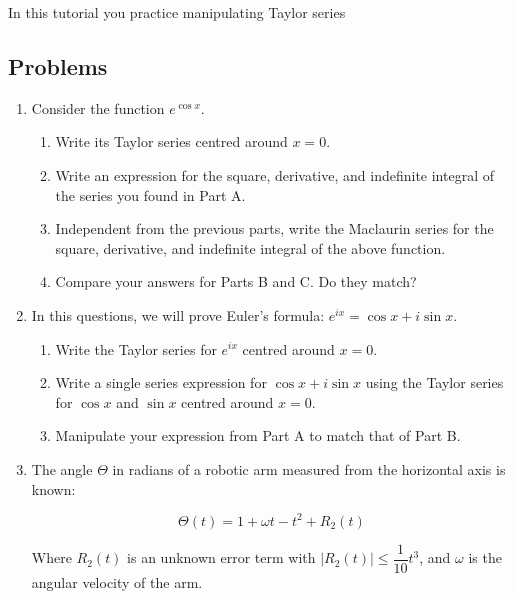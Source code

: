 		\begin{objectives}
			In this tutorial you practice manipulating Taylor series
		\end{objectives}

\subsection*{Problems}




\begin{enumerate}
    \item Consider the function $e^{\cos{x}}$. 
    
    \begin{enumerate}
        \item Write its Taylor series centred around $x=0$.
        \item Write an expression for the square, derivative, and indefinite integral of the series you found in Part A.
        \item Independent from the previous parts, write the Maclaurin series for the square, derivative, and indefinite integral of the above function.
        \item Compare your answers for Parts B and C. Do they match?
    \end{enumerate}

	\item In this questions, we will prove Euler's formula: $e^{ix} = \cos{x} + i\sin{x}$.
    \begin{enumerate}
        \item Write the Taylor series for $e^{ix}$ centred around $x=0$.
        \item Write a single series expression for $\cos{x} + i\sin{x}$ using the Taylor series for $\cos{x}$ and $\sin{x}$ centred around $x=0$.
        \item Manipulate your expression from Part A to match that of Part B.
    \end{enumerate}

    \item The angle $\Theta$ in radians of a robotic arm measured from the horizontal axis is known:

    \[\Theta(t) = 1 + \omega t - t^2 + R_2(t) \]

    Where $R_2(t)$ is an unknown error term with $|R_2(t)| \leq \dfrac{1}{10}t^3$, and $\omega$ is the angular velocity of the arm.  
    \begin{enumerate}


\end{enumerate}
\end{enumerate}
